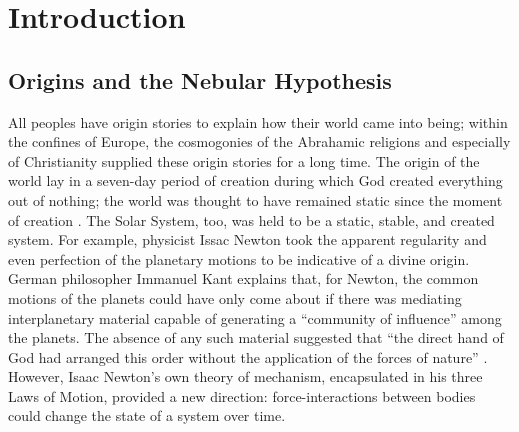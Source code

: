 \documentclass[12pt,oneside]{book}
\begin{document}
\frontmatter %

\pagestyle{empty}


% 

\tableofcontents \pagestyle{empty}

\mainmatter 
\pagestyle{fancy}
\fancyhf{}
\fancyhead[R]{\thepage}
\fancyhead[L]{\leftmark}
\renewcommand{\chaptermark}[1]{\markboth{\scshape \thechapter.\ #1} {}}


\chapter{Introduction}
\label{chapter: introduction}

\section{Origins and the Nebular Hypothesis}
\label{origins intro}

All peoples have origin stories to explain how their world came into being; within the confines of Europe, the cosmogonies of the Abrahamic religions and especially of Christianity supplied these origin stories for a long time.
The origin of the world lay in a seven-day period of creation during which God created everything out of nothing; the world was thought to have remained static since the moment of creation \citep{kragh17,luminet16}. 
The Solar System, too, was held to be a static, stable, and created system.
For example, physicist Issac Newton took the apparent regularity and even perfection of the planetary motions to be indicative of a divine origin.
German philosopher Immanuel Kant explains that, for Newton, the common motions of the planets could have only come about if there was mediating interplanetary material capable of generating a ``community of influence'' among the planets.
The absence of any such material suggested that ``the direct hand of God had arranged this order without the application of the forces of nature'' \citep[226-227]{kant_2012}.
However, Isaac Newton's own theory of mechanism, encapsulated in his three Laws of Motion, provided a new direction: force-interactions between bodies could change the state of a system over time.
\end{document}
